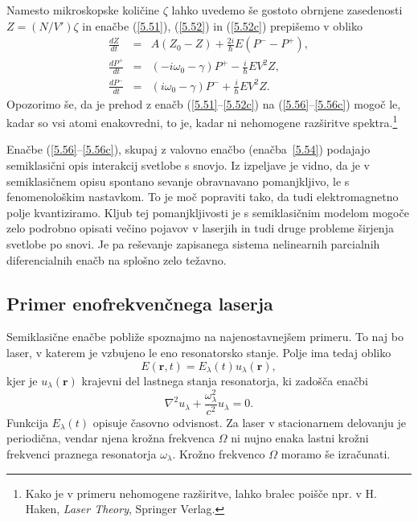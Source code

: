Namesto mikroskopske količine $\zeta$ lahko uvedemo še gostoto obrnjene
zasedenosti $Z=(N/V')\zeta$ in enačbe (\ref{5.51}), (\ref{5.52}) in (\ref{5.52c})
prepišemo v obliko 
\begin{eqnarray}
\frac{dZ}{dt} &= &A\left(Z_0-Z\right)+\frac{2i}{\hbar}E\left(P^- - P^+\right), \label{5.56} \\
\frac{dP^+}{dt}&=&\left(-i \omega_0-\gamma\right)P^{+}-\frac{i}{\hbar} EV^2 Z, \label{5.56b}\\
\frac{dP^-}{dt}&=&\left(i \omega_0-\gamma\right)P^{-}+\frac{i}{\hbar} EV^2 Z.\label{5.56c} 
\end{eqnarray}
Opozorimo še, da je prehod z enačb (\ref{5.51}--\ref{5.52c}) na (\ref{5.56}--\ref{5.56c}) 
mogoč le, kadar so vsi atomi enakovredni, to je, kadar ni nehomogene razširitve 
spektra.\footnote{Kako je v primeru nehomogene razširitve, lahko bralec poišče npr. v 
H. Haken, {\it Laser Theory}, Springer Verlag.}

Enačbe (\ref{5.56}--\ref{5.56c}), skupaj z valovno enačbo (enačba~\ref{5.54}) podajajo
semiklasični opis interakcij svetlobe s snovjo. Iz izpeljave je vidno, da
je v semiklasičnem opisu spontano sevanje obravnavano pomanjkljivo, le s fenomenološkim
nastavkom. To je moč popraviti tako, da tudi elektromagnetno polje kvantiziramo. 
Kljub tej pomanjkljivosti je s semiklasičnim modelom mogoče zelo podrobno opisati 
večino pojavov v laserjih in tudi druge probleme širjenja svetlobe po snovi. Je pa 
reševanje zapisanega sistema nelinearnih parcialnih diferencialnih enačb  
na splošno zelo težavno.

\subsection*{Primer enofrekvenčnega laserja}
Semiklasične enačbe pobliže spoznajmo na najenostavnejšem primeru. To naj bo laser, 
v katerem je vzbujeno le eno resonatorsko stanje. Polje ima tedaj obliko
\begin{equation}  
\label{5.57}
E(\mathbf{r},t)= E_{\lambda}(t)u_{\lambda}(\mathbf{r}),
\end{equation}
kjer je $u_{\lambda}(\mathbf{r})$ krajevni del lastnega stanja resonatorja, ki
zadošča enačbi 
\begin{equation}  
\label{5.58}
\nabla^2 u_{\lambda}+\frac{\omega_{\lambda}^2}{c^2}u_{\lambda}=0.
\end{equation}
Funkcija $E_{\lambda}(t)$ opisuje časovno odvisnost. Za laser v stacionarnem
delovanju je periodična, vendar njena krožna frekvenca $\Omega$ ni nujno enaka lastni
krožni frekvenci praznega resonatorja $\omega_{\lambda}$. Krožno frekvenco 
$\Omega$ moramo še izračunati.

